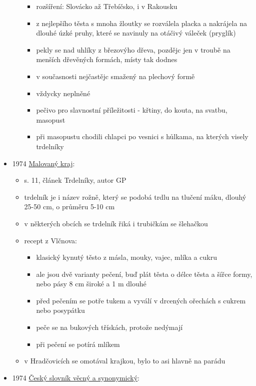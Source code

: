 \begin{itemize}
\begin{itemize}
    \begin{itemize}
    \tightlist
    \item
      rozšíření: Slovácko až Třebíčsko, i v Rakousku
    \item
      z nejlepšího těsta s mnoha žloutky se rozválela placka a nakrájela
      na dlouhé úzké pruhy, které se navinuly na otáčivý váleček
      (pryglík)
    \item
      pekly se nad uhlíky z březovýho dřeva, pozdějc jen v troubě na
      menších dřevěných formách, místy tak dodnes
    \item
      v současnosti nejčastějc smažený na plechový formě
    \item
      vždycky neplněné
    \item
      pečivo pro slavnostní příležitosti - křtiny, do kouta, na svatbu,
      masopust
    \item
      při masopustu chodili chlapci po vesnici s hůlkama, na kterých
      visely trdelníky
    \end{itemize}
  \end{itemize}
\item
  1974
  \href{https://ndk.cz/uuid/uuid:630185b0-f30f-11e3-a012-005056825209}{Malovaný
  kraj}:

  \begin{itemize}
  \tightlist
  \item
    s. 11, článek Trdelníky, autor GP
  \item
    trdelník je i název rožně, který se podobá trdlu na tlučení máku,
    dlouhý 25-50 cm, o průměru 5-10 cm
  \item
    v některých obcích se trdelník řiká i trubičkám se šlehačkou
  \item
    recept z Vlčnova:

    \begin{itemize}
    \tightlist
    \item
      klasický kynutý těsto z másla, mouky, vajec, mlíka a cukru
    \item
      ale jsou dvě varianty pečení, buď plát těsta o délce těsta a šířce
      formy, nebo pásy 8 cm široké a 1 m dlouhé
    \item
      před pečením se potře tukem a vyválí v drcených ořechách s cukrem
      nebo posypátku
    \item
      peče se na bukových třískách, protože nedýmají
    \item
      při pečení se potírá mlíkem
    \end{itemize}
  \item
    v Hradčovicích se omotával krajkou, bylo to asi hlavně na parádu
  \end{itemize}
\item
  1974
  \href{https://ceskadigitalniknihovna.cz/uuid/uuid:9a981180-f289-11ea-9c2e-005056827e51}{Český
  slovník věcný a synonymický}:


\end{itemize}

